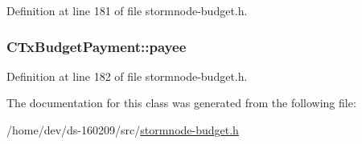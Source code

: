 Definition at line 181 of file stormnode-\/budget.\+h.

\hypertarget{class_c_tx_budget_payment_a503a9395a6f3ff0e1d81104a3dbf5697}{}
\subsubsection[{payee}]{ C\+Tx\+Budget\+Payment\+::payee}\label{class_c_tx_budget_payment_a503a9395a6f3ff0e1d81104a3dbf5697}


Definition at line 182 of file stormnode-\/budget.\+h.



The documentation for this class was generated from the following file\+:\begin{DoxyCompactItemize}
\item 
/home/dev/ds-\/160209/src/\hyperlink{stormnode-budget_8h}{stormnode-\/budget.\+h}\end{DoxyCompactItemize}
